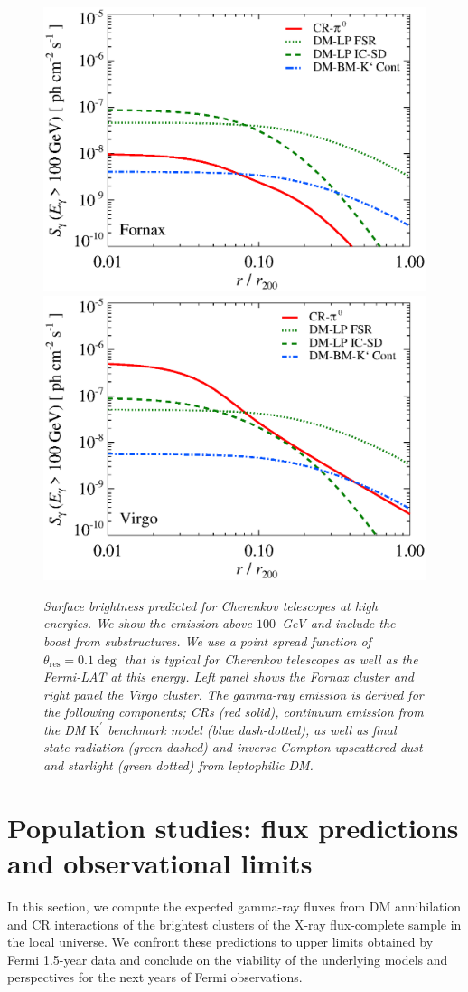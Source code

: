 \documentclass[10pt,aps,pra,reprint,amsmath,amsfonts,amssymb,showpacs,nofootinbib,floatfix]{revtex4-1}
\newcommand{\rmn}{\mathrm}
\newcommand{\psf}{\theta_\rmn{res}}
\newcommand{\Kp}{\rmn{K}^\prime}
\begin{document}
\begin{figure}
\begin{minipage}{2.0\columnwidth}
  \includegraphics[width=0.49\columnwidth]{figures/SB.Fornax.v12.SF300.SubMass.elmu.eps}
  \includegraphics[width=0.49\columnwidth]{figures/SB.Virgo.v12.SF300.SubMass.elmu.eps}
\caption{\it Surface brightness predicted for Cherenkov telescopes at
  high energies. We show the emission above $100$~GeV and include the
  boost from substructures. We use a point spread function of
  $\psf=0.1\deg$ that is typical for Cherenkov
  telescopes as well as the Fermi-LAT at this energy. Left panel shows
  the Fornax cluster and right panel the Virgo cluster. The gamma-ray
  emission is derived for the following components; CRs (red solid),
  continuum emission from the DM $\Kp$ benchmark model (blue
  dash-dotted), as well as final state radiation (green dashed) and
  inverse Compton upscattered dust and starlight (green dotted) from
  leptophilic DM.}
 \label{fig:SB_IACTs}
\end{minipage}
\end{figure}



\section{Population studies: flux predictions and observational limits}

In this section, we compute the expected gamma-ray fluxes from DM
annihilation and CR interactions of the brightest clusters of the
X-ray flux-complete sample in the local universe. We confront these
predictions to upper limits obtained by Fermi 1.5-year data and
conclude on the viability of the underlying models and perspectives
for the next years of Fermi observations.
\end{document}
